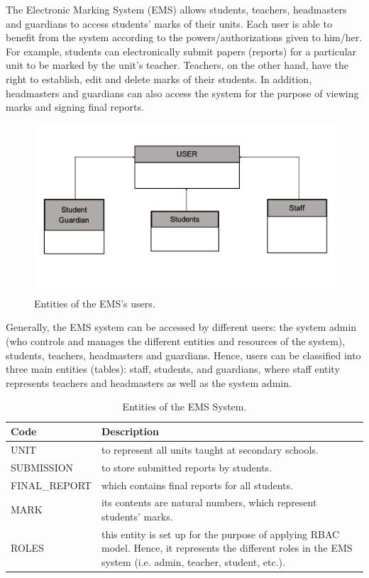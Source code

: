 The Electronic Marking System (EMS) allows students, teachers, headmasters and guardians to access students’ marks of their units.  Each user is able to benefit from the system according to the powers/authorizations given to him/her.  For example, students can electronically submit papers (reports) for a particular unit to be marked by the unit’s teacher.  Teachers, on the other hand, have the right to establish, edit and delete marks of their students.  In addition, headmasters and guardians can also access the system for the purpose of viewing marks and signing final reports.  

\begin{figure}[bht]
\centering
\includegraphics[scale=0.26]{EMSEntities.png}
\caption{Entities of the EMS's users.}
\label{fig:RBACPol}
\end{figure}

Generally, the EMS system can be accessed by different users: the system admin (who controls and manages the different entities and resources of the system), students, teachers, headmasters and guardians.  Hence, users can be classified into three main entities (tables): staff, students, and guardians, where staff entity represents teachers and headmasters as well as the system admin.

\begin{table}[bth]
\centering
\caption{Entities of the EMS System.}
\small
{}
\begin{tabular}{p{0.8 in} p{6 in}} \hline 
\hline
Code & Description\\\hline\hline

UNIT& to represent all units taught at secondary schools. \\ 
SUBMISSION& to store submitted reports by students. \\ 
FINAL\_REPORT& which contains final reports for all students. \\ 
MARK& its contents are natural numbers, which represent students’ marks. \\ 
ROLES& this entity is set up for the purpose of applying RBAC model.  Hence, it represents the different roles in the EMS system (i.e. admin, teacher, student, etc.).\\ \hline\hline
\end{tabular}
\label{tab:namehere}
\end{table}



